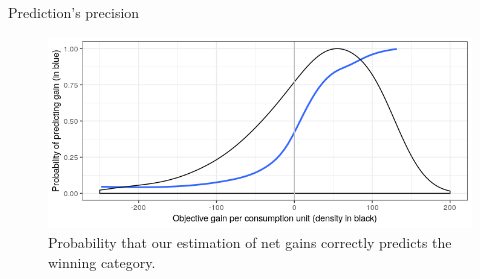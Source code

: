\documentclass[aspectratio=169,9pt,dvipsnames]{beamer}
\begin{document}
\begin{frame}{Prediction's precision} \label{prediction_precision}

\begin{figure}
\includegraphics[width=\columnwidth]{Images/proba_correct_prediction.png}
\caption{Probability that our estimation of net gains correctly predicts the winning category.}
\end{figure}

\hyperlink{consumer_survey_data}{}

\end{frame}
\end{document}
